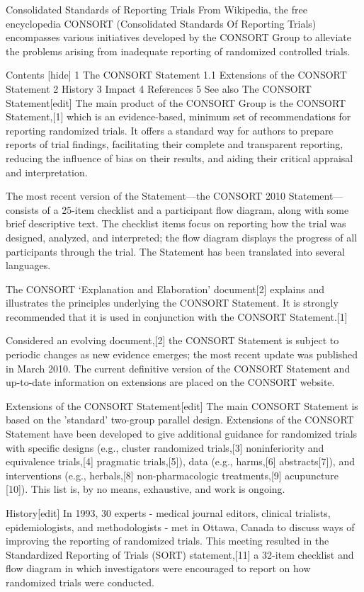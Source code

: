 Consolidated Standards of Reporting Trials
From Wikipedia, the free encyclopedia
CONSORT (Consolidated Standards Of Reporting Trials) encompasses various initiatives developed by the CONSORT Group to alleviate the problems arising from inadequate reporting of randomized controlled trials.

Contents  [hide] 
1	The CONSORT Statement
1.1	Extensions of the CONSORT Statement
2	History
3	Impact
4	References
5	See also
The CONSORT Statement[edit]
The main product of the CONSORT Group is the CONSORT Statement,[1] which is an evidence-based, minimum set of recommendations for reporting randomized trials. It offers a standard way for authors to prepare reports of trial findings, facilitating their complete and transparent reporting, reducing the influence of bias on their results, and aiding their critical appraisal and interpretation.

The most recent version of the Statement—the CONSORT 2010 Statement—consists of a 25-item checklist and a participant flow diagram, along with some brief descriptive text. The checklist items focus on reporting how the trial was designed, analyzed, and interpreted; the flow diagram displays the progress of all participants through the trial. The Statement has been translated into several languages.

The CONSORT ‘Explanation and Elaboration’ document[2] explains and illustrates the principles underlying the CONSORT Statement. It is strongly recommended that it is used in conjunction with the CONSORT Statement.[1]

Considered an evolving document,[2] the CONSORT Statement is subject to periodic changes as new evidence emerges; the most recent update was published in March 2010. The current definitive version of the CONSORT Statement and up-to-date information on extensions are placed on the CONSORT website.

Extensions of the CONSORT Statement[edit]
The main CONSORT Statement is based on the 'standard' two-group parallel design. Extensions of the CONSORT Statement have been developed to give additional guidance for randomized trials with specific designs (e.g., cluster randomized trials,[3] noninferiority and equivalence trials,[4] pragmatic trials,[5]), data (e.g., harms,[6] abstracts[7]), and interventions (e.g., herbals,[8] non-pharmacologic treatments,[9] acupuncture [10]). This list is, by no means, exhaustive, and work is ongoing.

History[edit]
In 1993, 30 experts - medical journal editors, clinical trialists, epidemiologists, and methodologists - met in Ottawa, Canada to discuss ways of improving the reporting of randomized trials. This meeting resulted in the Standardized Reporting of Trials (SORT) statement,[11] a 32-item checklist and flow diagram in which investigators were encouraged to report on how randomized trials were conducted.

